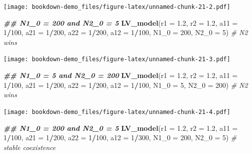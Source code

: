 \documentclass[
]{book}
\newenvironment{Shaded}{\begin{snugshade}}{\end{snugshade}}
\newcommand{\AttributeTok}[1]{\textcolor[rgb]{0.13,0.29,0.53}{#1}}
\newcommand{\CommentTok}[1]{\textcolor[rgb]{0.56,0.35,0.01}{\textit{#1}}}
\newcommand{\DecValTok}[1]{\textcolor[rgb]{0.00,0.00,0.81}{#1}}
\newcommand{\DocumentationTok}[1]{\textcolor[rgb]{0.56,0.35,0.01}{\textbf{\textit{#1}}}}
\newcommand{\FloatTok}[1]{\textcolor[rgb]{0.00,0.00,0.81}{#1}}
\newcommand{\FunctionTok}[1]{\textcolor[rgb]{0.13,0.29,0.53}{\textbf{#1}}}
\newcommand{\NormalTok}[1]{#1}
\newcommand{\SpecialCharTok}[1]{\textcolor[rgb]{0.81,0.36,0.00}{\textbf{#1}}}
\begin{document}
\texttt{[image: bookdown-demo\_files/figure-latex/unnamed-chunk-21-2.pdf]}

\begin{Shaded}
\begin{Highlighting}[]
  \DocumentationTok{\#\# N1\_0 = 200 and N2\_0 = 5}
  \FunctionTok{LV\_model}\NormalTok{(}\AttributeTok{r1 =} \FloatTok{1.2}\NormalTok{, }\AttributeTok{r2 =} \FloatTok{1.2}\NormalTok{, }\AttributeTok{a11 =} \DecValTok{1}\SpecialCharTok{/}\DecValTok{100}\NormalTok{, }\AttributeTok{a21 =} \DecValTok{1}\SpecialCharTok{/}\DecValTok{200}\NormalTok{, }\AttributeTok{a22 =} \DecValTok{1}\SpecialCharTok{/}\DecValTok{200}\NormalTok{, }\AttributeTok{a12 =} \DecValTok{1}\SpecialCharTok{/}\DecValTok{100}\NormalTok{, }\AttributeTok{N1\_0 =} \DecValTok{200}\NormalTok{, }\AttributeTok{N2\_0 =} \DecValTok{5}\NormalTok{)  }\CommentTok{\# N2 wins}
\end{Highlighting}
\end{Shaded}

\texttt{[image: bookdown-demo\_files/figure-latex/unnamed-chunk-21-3.pdf]}

\begin{Shaded}
\begin{Highlighting}[]
  \DocumentationTok{\#\# N1\_0 = 5 and N2\_0 = 200}
  \FunctionTok{LV\_model}\NormalTok{(}\AttributeTok{r1 =} \FloatTok{1.2}\NormalTok{, }\AttributeTok{r2 =} \FloatTok{1.2}\NormalTok{, }\AttributeTok{a11 =} \DecValTok{1}\SpecialCharTok{/}\DecValTok{100}\NormalTok{, }\AttributeTok{a21 =} \DecValTok{1}\SpecialCharTok{/}\DecValTok{200}\NormalTok{, }\AttributeTok{a22 =} \DecValTok{1}\SpecialCharTok{/}\DecValTok{200}\NormalTok{, }\AttributeTok{a12 =} \DecValTok{1}\SpecialCharTok{/}\DecValTok{100}\NormalTok{, }\AttributeTok{N1\_0 =} \DecValTok{5}\NormalTok{, }\AttributeTok{N2\_0 =} \DecValTok{200}\NormalTok{)  }\CommentTok{\# N2 wins}
\end{Highlighting}
\end{Shaded}

\texttt{[image: bookdown-demo\_files/figure-latex/unnamed-chunk-21-4.pdf]}

\begin{Shaded}
\begin{Highlighting}[]
  \DocumentationTok{\#\# N1\_0 = 200 and N2\_0 = 5}
  \FunctionTok{LV\_model}\NormalTok{(}\AttributeTok{r1 =} \FloatTok{1.2}\NormalTok{, }\AttributeTok{r2 =} \FloatTok{1.2}\NormalTok{, }\AttributeTok{a11 =} \DecValTok{1}\SpecialCharTok{/}\DecValTok{100}\NormalTok{, }\AttributeTok{a21 =} \DecValTok{1}\SpecialCharTok{/}\DecValTok{200}\NormalTok{, }\AttributeTok{a22 =} \DecValTok{1}\SpecialCharTok{/}\DecValTok{100}\NormalTok{, }\AttributeTok{a12 =} \DecValTok{1}\SpecialCharTok{/}\DecValTok{300}\NormalTok{, }\AttributeTok{N1\_0 =} \DecValTok{200}\NormalTok{, }\AttributeTok{N2\_0 =} \DecValTok{5}\NormalTok{)  }\CommentTok{\# stable coexistence}
\end{Highlighting}
\end{Shaded}
\end{document}
